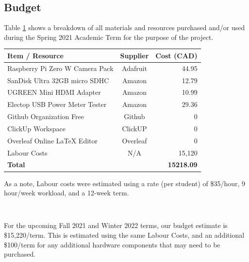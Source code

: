 \documentclass[a4paper,11pt]{article}
\begin{document}
\newpage
\subsection{Budget}
Table \ref{Tab:budget} shows a breakdown of all materials and resources purchased and/or used during the Spring 2021 Academic Term for the purpose of the project.

\begin{table}[ht]
    \centering
    \begin{tabular}{|l|c|r|}
        \hline
        
        \textbf{Item / Resource} & \textbf{Supplier} & \textbf{Cost (CAD)}
        \\ \hline
        Raspberry Pi Zero W Camera Pack & Adafruit      & 44.95
        \\ \hline
        SanDisk Ultra 32GB micro SDHC   & Amazon        & 12.79
        \\ \hline
        UGREEN Mini HDMI Adapter        & Amazon        & 10.99
        \\ \hline
        Electop USB Power Meter Tester  & Amazon        & 29.36
        \\ \hline
        Github Organization Free        & Github        & 0
        \\ \hline
        ClickUp Workspace               & ClickUP       & 0
        \\ \hline
        Overleaf Online LaTeX Editor    & Overleaf      & 0
        \\ \hline
        Labour Costs                    & N/A           & 15,120
        \\ \hline
        \textbf{Total}                  & \multicolumn{2}{r|}{\textbf{15218.09}}
        \\ \hline
    \end{tabular}
    \label{Tab:budget}
\end{table}
\noindent
As a note, Labour costs were estimated using a rate (per student) of \$35/hour, 9 hour/week workload, and a 12-week term.

\

\noindent
For the upcoming Fall 2021 and Winter 2022 terms, our budget estimate is \$15,220/term. This is estimated using the same Labour Costs, and an additional \$100/term for any additional hardware components that may need to be purchased.
\end{document}
